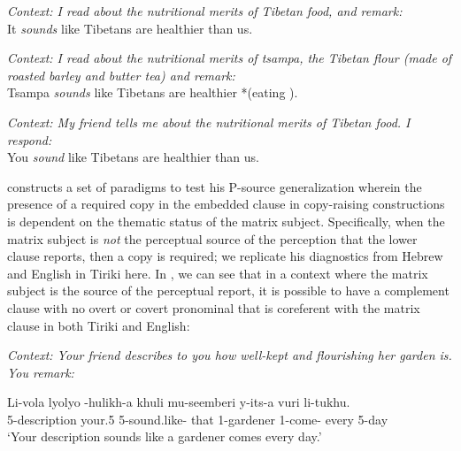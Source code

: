 \documentclass[output=paper,colorlinks,citecolor=brown
]{langscibook}
\begin{document}
\ea
\begin{xlist}
\ex
{}

\textit{Context: I read about the nutritional merits of Tibetan food, and remark:}\\
It \textit{sounds} like Tibetans are healthier than us.

\ex
{}

\textit{Context: I read about the nutritional merits of \textit{tsampa}, the Tibetan flour (made of roasted barley and butter tea) and remark:}\\
Tsampa \textit{sounds} like Tibetans are healthier *(eating ).

\ex
{}

\textit{Context: My friend tells me about the nutritional merits of Tibetan food. I respond:}\\
You \textit{sound} like Tibetans are healthier than us. \\ \citep[41]{Landau:2011:CopyRaising}
\end{xlist}
\z

\citet{Landau:2011:CopyRaising} constructs a set of  paradigms to test his P-source generalization wherein the presence of a required copy in the embedded clause in copy-raising constructions is dependent on the thematic status of the matrix subject. Specifically, when the matrix subject is \textit{not} the perceptual source of the perception that the lower clause reports, then a copy is required; we replicate his diagnostics from Hebrew and English in Tiriki here. In , we can see that in a context where the matrix subject is the source of the perceptual report, it is possible to have a complement clause with no overt or covert pronominal that is coreferent with the matrix clause in both Tiriki and English: 

 

\ea \textit{Context: Your friend describes to you how well-kept and flourishing her garden is. You remark:} \label{ex:johnson:HearAboutGardenDescription}

\gll Li-vola lyolyo -hulikh-a khuli mu-seemberi y-its-a vuri li-tukhu.\\
5-description your.5 5\Sm-sound.like-\Fv{} that 1-gardener 1\Sm-come-\Fv{} every 5-day \\
\glt `Your description sounds like a gardener comes every day.' 
\end{document}
